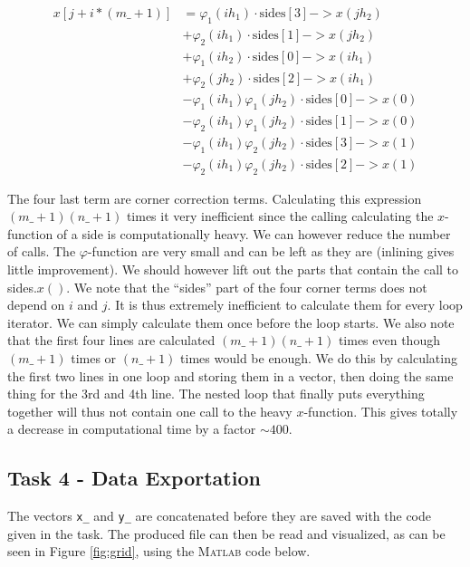 \documentclass[paper=a4, fontsize=12pt]{article} %
\begin{document}
\begin{align*}
x[j+i*(m\_+1)]  &= \varphi_1(ih_1)\cdot \textrm{sides}[3]->x(jh_2) \\
	&+ \varphi_2(ih_1)\cdot \textrm{sides}[1]->x(jh_2) \\
	&+ \varphi_1(ih_2)\cdot \textrm{sides}[0]->x(ih_1) \\
	&+ \varphi_2(jh_2)\cdot \textrm{sides}[2]->x(ih_1) \\
	&- \varphi_1(ih_1) \varphi_1(jh_2) \cdot  \textrm{sides}[0]->x(0) \\
	&- \varphi_2(ih_1) \varphi_1(jh_2) \cdot  \textrm{sides}[1]->x(0) \\
	&- \varphi_1(ih_1) \varphi_2(jh_2) \cdot  \textrm{sides}[3]->x(1) \\
	&- \varphi_2(ih_1) \varphi_2(jh_2) \cdot  \textrm{sides}[2]->x(1)
\end{align*}

The four last term are corner correction terms. Calculating this expression $(m\_+1)(n\_+1)$ times it very inefficient since the calling calculating the $x$-function of a side is computationally heavy. We can however reduce the number of calls. The $\varphi$-function are very small and can be left as they are (inlining gives little improvement). We should however lift out the parts that contain the call to sides.$x()$. We note that the ``sides'' part of the four corner terms does not depend on $i$ and $j$. It is thus extremely inefficient to calculate them for every loop iterator. We can simply calculate them once before the loop starts. We also note that the first four lines are calculated $(m\_+1)(n\_+1)$ times even though $(m\_+1)$ times or $(n\_+1)$ times would be enough. We do this by calculating the first two lines in one loop and storing them in a vector, then doing the same thing for the 3rd and 4th line. The nested loop that finally puts everything together will thus not contain one call to the heavy $x$-function. This gives totally a decrease in computational time by a factor $\sim 400$.\\

\subsection*{Task 4 - Data Exportation}

The vectors \texttt{x\_} and \texttt{y\_} are concatenated before they are saved with
the code given in the task. The produced file can then be read and
visualized, as can be seen in Figure \ref{fig:grid}, using
the \textsc{Matlab} code below.
\end{document}
